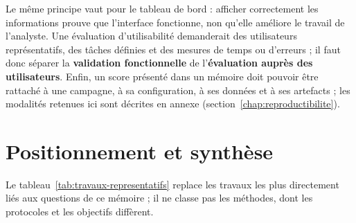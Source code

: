 Le même principe vaut pour le tableau de bord : afficher correctement les informations prouve que l'interface fonctionne, non qu'elle améliore le travail de l'analyste. Une évaluation d'utilisabilité demanderait des utilisateurs représentatifs, des tâches définies et des mesures de temps ou d'erreurs ; il faut donc séparer la \textbf{validation fonctionnelle} de l'\textbf{évaluation auprès des utilisateurs}. Enfin, un score présenté dans un mémoire doit pouvoir être rattaché à une campagne, à sa configuration, à ses données et à ses artefacts ; les modalités retenues ici sont décrites en annexe (section~\ref{chap:reproductibilite}).

\section{Positionnement et synthèse}

Le tableau~\ref{tab:travaux-representatifs} replace les travaux les plus directement liés aux questions de ce mémoire ; il ne classe pas les méthodes, dont les protocoles et les objectifs diffèrent.

